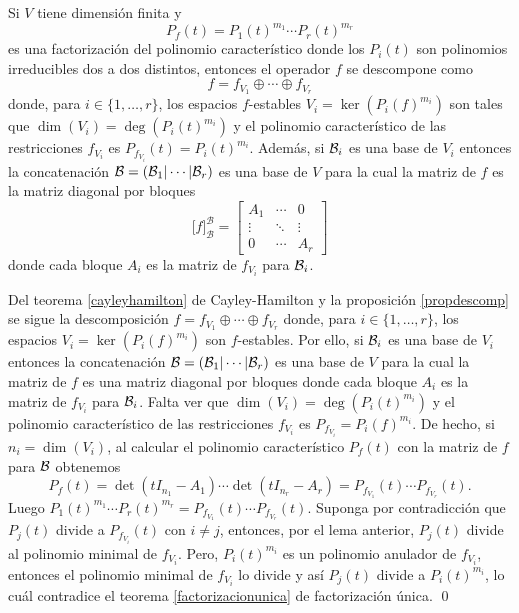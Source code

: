 \begin{teo}
  Si $V$ tiene dimensión finita y $$P_f(t)=P_1(t)^{m_1}\cdots P_r(t)^{m_r}$$ es una factorización del polinomio característico donde los $P_i(t)$ son polinomios irreducibles dos a dos distintos, entonces el operador $f$ se descompone como $$f=f_{V_1}\oplus\cdots\oplus f_{V_r}$$ donde, para $i\in\{1,\ldots,r\}$, los espacios $f$-estables $V_i=\ker\left(P_i(f)^{m_i}\right)$ son tales que $\dim(V_i)=\deg\left(P_i(t)^{m_i}\right)$ y el polinomio característico de las restricciones $f_{V_i}$ es $P_{f_{V_i}}(t)=P_i(t)^{m_i}$. Además, si $\mathcal{B}_i$ es una base de $V_i$ entonces la concatenación $\mathcal{B}=(\mathcal{B}_1|\cdots|\mathcal{B}_r)$ es una base de $V$ para la cual la matriz de $f$ es la matriz diagonal por bloques
  \[
    \Big[f\Big]^\mathcal{B}_\mathcal{B}=\left[\begin{array}{c|c|c}
      A_1 & \cdots & 0\\
      \hline
      \vdots & \ddots & \vdots\\
      \hline
      0 & \cdots & A_r
      \end{array}\right] 
  \]
  donde cada bloque $A_i$ es la matriz de $f_{V_i}$ para $\mathcal{B}_i$. 
\end{teo}

\dem Del teorema \ref{cayleyhamilton} de Cayley-Hamilton y la proposición \ref{propdescomp} se sigue la descomposición $f=f_{V_1}\oplus\cdots\oplus f_{V_r}$ donde, para $i\in\{1,\ldots,r\}$, los espacios $V_i=\ker\left(P_i(f)^{m_i}\right)$ son $f$-estables. Por ello, si $\mathcal{B}_i$ es una base de $V_i$ entonces la concatenación $\mathcal{B}=(\mathcal{B}_1|\cdots|\mathcal{B}_r)$ es una base de $V$ para la cual la matriz de $f$ es una matriz diagonal por bloques donde cada bloque $A_i$ es la matriz de $f_{V_i}$ para $\mathcal{B}_i$. Falta ver que $\dim(V_i)=\deg\left(P_i(t)^{m_i}\right)$ y el polinomio característico de las restricciones $f_{V_i}$ es $P_{f_{V_i}}=P_i(f)^{m_i}$. De hecho, si $n_i=\dim(V_i)$, al calcular el polinomio característico $P_f(t)$ con la matriz de $f$ para $\mathcal{B}$ obtenemos
$$P_f(t)=\det(tI_{n_1}-A_1)\cdots\det(tI_{n_r}-A_r)=P_{f_{V_1}}(t)\cdots P_{f_{V_r}}(t).$$
Luego $P_1(t)^{m_1}\cdots P_r(t)^{m_r}=P_{f_{V_1}}(t)\cdots P_{f_{V_r}}(t)$. Suponga por contradicción que $P_j(t)$ divide a $P_{f_{V_i}}(t)$ con $i\ne j$, entonces, por el lema anterior, $P_j(t)$ divide al polinomio minimal de $f_{V_i}$. Pero, $P_i(t)^{m_i}$ es un polinomio anulador de $f_{V_i}$, entonces el polinomio minimal de $f_{V_i}$ lo divide y así $P_j(t)$ divide a $P_i(t)^{m_i}$, lo cuál contradice el teorema \ref{factorizacionunica} de factorización única. 
\qed 


